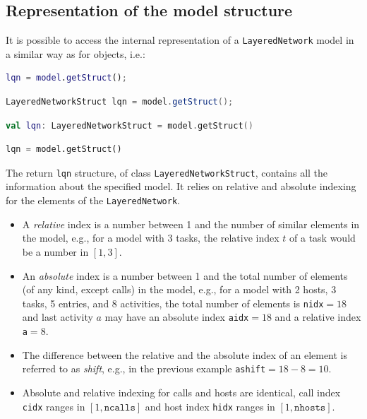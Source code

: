 \subsection{Representation of the model structure}
It is possible to access the internal representation of a \texttt{LayeredNetwork} model in a similar way as for  objects, i.e.:
\begin{MATLAB}
\begin{lstlisting}[language = matlab]
lqn = model.getStruct();
\end{lstlisting}
\end{MATLAB}
\begin{JAVA}
\begin{lstlisting}[language = java, basicstyle=\ttfamily\scriptsize]
LayeredNetworkStruct lqn = model.getStruct();
\end{lstlisting}
\end{JAVA}
\begin{KOTLIN}
\begin{lstlisting}[language = kotlin, basicstyle=\ttfamily\scriptsize]
val lqn: LayeredNetworkStruct = model.getStruct()
\end{lstlisting}
\end{KOTLIN}
\begin{PYTHON}
\begin{lstlisting}[language=python]
lqn = model.getStruct()
\end{lstlisting}
\end{PYTHON}
The return \texttt{lqn} structure, of class \texttt{LayeredNetworkStruct}, contains all the information about the specified model. It relies on relative and absolute indexing for the elements of the \texttt{LayeredNetwork}. 
\begin{itemize}
    \item A \textit{relative} index is a number between 1 and the number of similar elements in the model, e.g., for a model with 3 tasks, the relative index $t$ of a task would be a number in $[1,3]$.
    \item An \textit{absolute} index is a number between 1 and the total number of elements (of any kind, except calls) in the model, e.g., for a model with 2 hosts, 3 tasks, 5 entries, and 8 activities, the total number of elements is \texttt{nidx}$=18$ and last activity $a$ may have an absolute index \texttt{aidx}$=18$ and a relative index \texttt{a}$=8$. 
    \item The difference between the relative and the absolute index of an element is referred to as \textit{shift}, e.g., in the previous example \texttt{ashift}$=18-8=10$.
    \item Absolute and relative indexing for calls and hosts are identical, call index \texttt{cidx} ranges in $[1,\mathtt{ncalls}]$ and host index \texttt{hidx} ranges in $[1,\mathtt{nhosts}]$.
\end{itemize}
